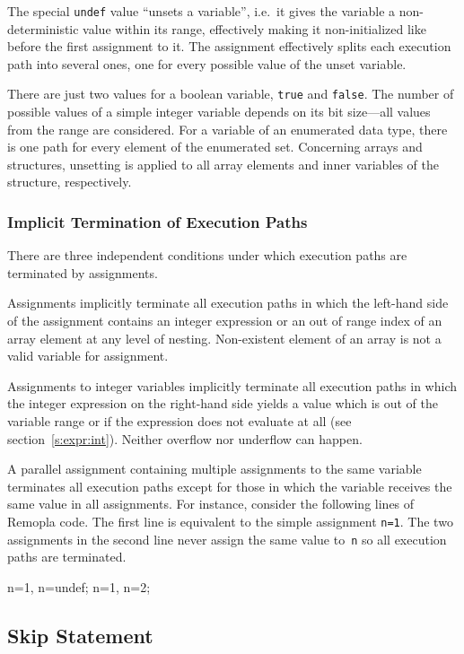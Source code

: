 \documentclass[a4paper,11pt,titlepage,english]{article}
\begin{document}
The special \verb|undef| value ``unsets a variable'', i.e.\ it gives
the variable a non-deterministic value within its range, effectively
making it 
non-initialized like before the first assignment to it. The assignment
effectively splits each execution path into several ones, one for every
possible value of the unset variable. 

There are just two values for a boolean variable, \verb|true| and
\verb|false|. The number of possible values of a simple integer variable
depends on its bit size---all values from the range are considered. For
a variable of an enumerated data type, there is one path for every element
of the enumerated set. Concerning arrays and structures, unsetting is
applied to all array elements and inner variables of the
structure, respectively.

\subsubsection{Implicit Termination of Execution Paths}

There are three independent conditions under which execution paths are
terminated by assignments.

Assignments implicitly terminate all execution paths in which the left-hand
side of the assignment contains an integer expression or an out of range
index of an array element at any level of nesting. Non-existent element of
an array is not a valid variable for assignment.

Assignments to integer variables implicitly terminate all execution paths
in which the integer expression on the right-hand side yields a value which
is out of the variable range or if the expression does not evaluate at all
(see section~\ref{s:expr:int}).  Neither overflow nor underflow can happen.

A parallel assignment containing multiple assignments to the same variable
terminates all execution paths except for those in which the variable
receives the same value in all assignments. For instance, consider the following
lines of Remopla code. The first line is equivalent to the simple assignment
\verb|n=1|. The two assignments in the second line never assign the same
value to~\verb|n| so all execution paths are terminated.
\begin{RemoplaSnippet}
    n=1, n=undef;
    n=1, n=2;
\end{RemoplaSnippet}


\subsection{Skip Statement\label{s:skip}}
\end{document}
